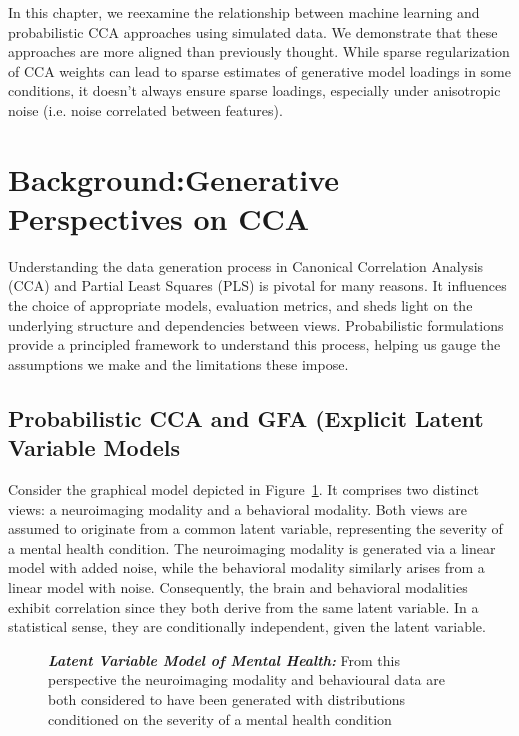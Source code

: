 In this chapter, we reexamine the relationship between machine learning and probabilistic CCA approaches using simulated data.
We demonstrate that these approaches are more aligned than previously thought.
While sparse regularization of CCA weights can lead to sparse estimates of generative model loadings in some conditions, it doesn't always ensure sparse loadings, especially under anisotropic noise (i.e. noise correlated between features).

\section{Background:Generative Perspectives on CCA}

Understanding the data generation process in Canonical Correlation Analysis (CCA) and Partial Least Squares (PLS) is pivotal for many reasons.
It influences the choice of appropriate models, evaluation metrics, and sheds light on the underlying structure and dependencies between views.
Probabilistic formulations provide a principled framework to understand this process, helping us gauge the assumptions we make and the limitations these impose.

\subsection{Probabilistic CCA and GFA (Explicit Latent Variable Models}\label{subsubsec:a-probabilistic-latent-variable-perspective-on-cca}

Consider the graphical model depicted in Figure~\ref{fig:mentalhealthselfsupervised}.
It comprises two distinct views: a neuroimaging modality and a behavioral modality.
Both views are assumed to originate from a common latent variable, representing the severity of a mental health condition.
The neuroimaging modality is generated via a linear model with added noise, while the behavioral modality similarly arises from a linear model with noise.
Consequently, the brain and behavioral modalities exhibit correlation since they both derive from the same latent variable.
In a statistical sense, they are conditionally independent, given the latent variable.

\begin{figure}
    \centering
    \caption[Latent Variable Model of Mental Health]{\textit{\textbf{Latent Variable Model of Mental Health:}} From this perspective the neuroimaging modality and behavioural data are both considered to have been generated with distributions conditioned on the severity of a mental health condition}\label{fig:mentalhealthselfsupervised}
\end{figure}


